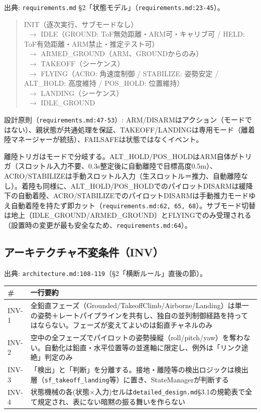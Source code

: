 \documentclass[a4paper,10pt]{ltjsarticle}
\begin{document}
出典: \texttt{requirements.md} §2「状態モデル」（\texttt{requirements.md:23-45}）。

\begin{quote}\ttfamily\footnotesize\noindent
INIT（逐次実行、サブモードなし）\\
\ $\rightarrow$ IDLE（GROUND: ToF無効距離・ARM可・キャリブ可 / HELD: ToF有効距離・ARM禁止・推定テスト可）\\
\ $\rightarrow$ ARMED\_GROUND（ARM、GROUNDからのみ）\\
\ $\rightarrow$ TAKEOFF（シーケンス）\\
\ $\rightarrow$ FLYING（ACRO: 角速度制御 / STABILIZE: 姿勢安定 / ALT\_HOLD: 高度維持 / POS\_HOLD: 位置維持）\\
\ $\rightarrow$ LANDING（シーケンス）\\
\ $\rightarrow$ IDLE\_GROUND
\end{quote}

設計原則（\texttt{requirements.md:47-53}）: ARM/DISARMはアクション（モードではない）、親状態が共通処理を保証、TAKEOFF/LANDINGは専用モード（離着陸マネージャーが統括）、FAILSAFEは状態ではなくイベント。

離陸トリガはモードで分岐する。ALT\_HOLD/POS\_HOLDはARM自体がトリガ（スロットル入力不要、0.3s整定後に自動離陸で目標高度0.5m）、ACRO/STABILIZEは手動スロットル入力（生スロットル＝推力、自動離陸なし）。着陸も同様に、ALT\_HOLD/POS\_HOLDでのパイロットDISARMは緩降下の自動着陸、ACRO/STABILIZEでのパイロットDISARMは手動推力モードゆえ自動着陸を持たず即カット（\texttt{requirements.md:62, 65, 68}）。サブモード切替は地上（IDLE\_GROUND/ARMED\_GROUND）とFLYINGでのみ受理される（設置時の変更が最も安全なため、\texttt{requirements.md:64}）。

\subsection{アーキテクチャ不変条件（INV）}

出典: \texttt{architecture.md:108-119}（§2「横断ルール」直後の節）。

\begin{table}[h]
\centering\footnotesize
\begin{tabularx}{\textwidth}{@{}lY@{}}
\toprule
\# & 一行要約 \\
\midrule
INV-1 & 全鉛直フェーズ（Grounded/TakeoffClimb/Airborne/Landing）は単一の姿勢＋レートパイプラインを共有し、独自の並列制御経路を持ってはならない。フェーズが変えてよいのは鉛直チャネルのみ \\
INV-2 & 空中の全フェーズでパイロットの姿勢操縦（roll/pitch/yaw）を奪わない。自動化は鉛直・水平位置等の並進軸に限定し、例外は「リンク途絶」判定のみ \\
INV-3 & 「検出」と「判断」を分離する。接地・離陸等の検出ロジックは検出層（\texttt{sf\_takeoff\_landing}等）に置き、StateManagerが判断する \\
INV-4 & 状態機械の各(状態×入力)セルは\texttt{detailed\_design.md}§3.1の規範表で全て規定され、表にない暗黙の振る舞いを作らない \\
\bottomrule
\end{tabularx}
\end{table}
\end{document}
